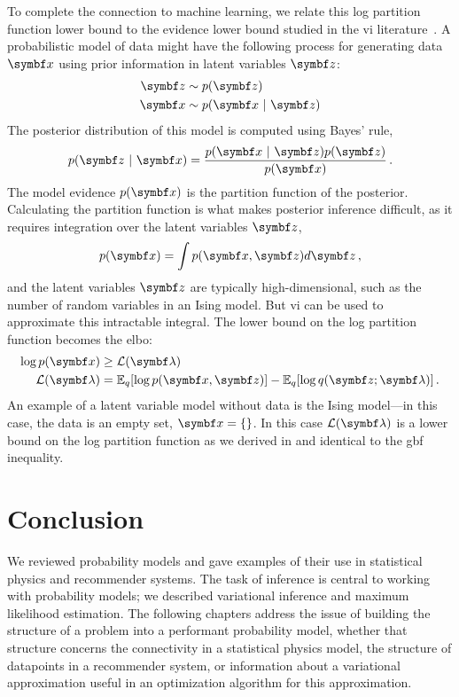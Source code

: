To complete the connection to machine learning, we relate this log partition function lower bound to the evidence lower bound studied in the \gls{vi} literature~\citep{blei2017variational}. A probabilistic model of data might have the following process for generating data $\mbx$ using prior information in latent variables $\mbz$:
\begin{align*}
\mbz &\sim p(\mbz)\\
\mbx &\sim p(\mbx \mid \mbz)
\end{align*}
The posterior distribution of this model is computed using Bayes' rule,
\begin{equation*}
  p(\mbz \mid \mbx) = \frac{p(\mbx \mid \mbz) p(\mbz)}{p(\mbx)} \, .
\end{equation*}
The model evidence $p(\mbx)$ is the partition function of the posterior. Calculating the partition function is what makes posterior inference difficult, as it requires integration over the latent variables $\mbz$,
\begin{equation*}
  p(\mbx) = \int p(\mbx, \mbz) d\mbz \, ,
\end{equation*}
and the latent variables $\mbz$ are typically high-dimensional, such as the number of random variables in an Ising model. But \gls{vi} can be used to approximate this intractable integral. The lower bound on the log partition function becomes the \gls{elbo}:
\begin{align}
\log p(\mbx) &\geq \cL(\mblambda) \\
\cL(\mblambda) &= \E_q[\log p(\mbx, \mbz)] - \E_q[\log q(\mbz ; \mblambda)] \, .
\end{align}
An example of a latent variable model without data is the Ising model---in this case, the data is an empty set, $\mbx = \{\}$. In this case $\cL(\mblambda)$ is a lower bound on the log partition function as we derived in  and identical to the \gls{gbf} inequality.

\section{Conclusion}
We reviewed probability models and gave examples of their use in statistical physics and recommender systems. The task of inference is central to working with probability models; we described variational inference and maximum likelihood estimation. The following chapters address the issue of building the structure of a problem into a performant probability model, whether that structure concerns the connectivity in a statistical physics model, the structure of datapoints in a recommender system, or information about a variational approximation useful in an optimization algorithm for this approximation.